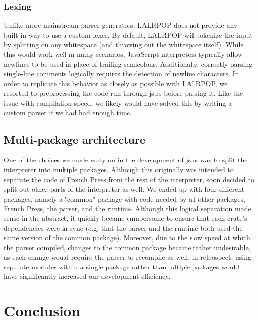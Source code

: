 \documentclass{article}
\begin{document}
\begin{multicols}{2}
\subsubsection*{Lexing}

Unlike more mainstream parser generators, LALRPOP does not provide any built-in
way to use a custom lexer. By default, LALRPOP will tokenize the input by
splitting on any whitespace (and throwing out the whitespace itself). While this
would work well in many scenarios, JavaScript interpreters typically allow
newlines to be used in place of trailing semicolons. Additionally, correctly
parsing single-line comments logically requires the detection of newline
characters. In order to replicate this behavior as closely as possible with
LALRPOP, we resorted to preprocessing the code run through js.rs before parsing
it. Like the issue with compilation speed, we likely would have solved this by
writing a custom parser if we had had enough time.

\subsection*{Multi-package architecture}

One of the choices we made early on in the development of js.rs was to split the
interpreter into multiple packages. Although this originally was intended to
separate the code of French Press from the rest of the interpreter, soon decided
to split out other parts of the interpreter as well. We ended up with four
different packages, namely a "common" package with code needed by all other
packages, French Press, the parser, and the runtime. Although this logical
separation made sense in the abstract, it quickly became cumbersome to ensure
that each crate's dependencies were in sync (e.g. that the parser and the
runtime both used the same version of the common package). Moreover, due to the
slow speed at which the parser compiled, changes to the common package became
rather undesirable, as each change would require the parser to recompile as
well. In retrospect, using separate modules within a single package rather than
:ultiple packages would have significantly increased our development efficiency.

\section{Conclusion}

\end{multicols}
\end{document}
